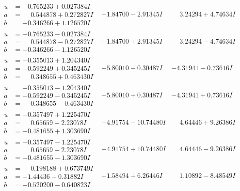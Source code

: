 \documentclass[1p]{elsarticle_modified}
\theoremstyle{definition}
\begin{document}
$$\begin{array}{c|c|c}
\begin{aligned}
u &= -0.765233 + 0.027384 I \\
a &= \phantom{-}0.544878 + 0.272827 I \\
b &= -0.346266 + 1.126520 I\end{aligned}
 & -1.84700 - 2.91345 I & \phantom{-}3.24294 + 4.74634 I \\ \hline\begin{aligned}
u &= -0.765233 - 0.027384 I \\
a &= \phantom{-}0.544878 - 0.272827 I \\
b &= -0.346266 - 1.126520 I\end{aligned}
 & -1.84700 + 2.91345 I & \phantom{-}3.24294 - 4.74634 I \\ \hline\begin{aligned}
u &= -0.355013 + 1.204340 I \\
a &= -0.592249 + 0.345245 I \\
b &= \phantom{-}0.348655 + 0.463430 I\end{aligned}
 & -5.80010 - 0.30487 I & -4.31941 - 0.73616 I \\ \hline\begin{aligned}
u &= -0.355013 - 1.204340 I \\
a &= -0.592249 - 0.345245 I \\
b &= \phantom{-}0.348655 - 0.463430 I\end{aligned}
 & -5.80010 + 0.30487 I & -4.31941 + 0.73616 I \\ \hline\begin{aligned}
u &= -0.357497 + 1.225470 I \\
a &= \phantom{-}0.65659 + 2.23078 I \\
b &= -0.481655 + 1.303690 I\end{aligned}
 & -4.91754 - 10.74480 I & \phantom{-}4.64446 + 9.26386 I \\ \hline\begin{aligned}
u &= -0.357497 - 1.225470 I \\
a &= \phantom{-}0.65659 - 2.23078 I \\
b &= -0.481655 - 1.303690 I\end{aligned}
 & -4.91754 + 10.74480 I & \phantom{-}4.64446 - 9.26386 I \\ \hline\begin{aligned}
u &= \phantom{-}0.198188 + 0.673749 I \\
a &= -1.44436 + 0.31882 I \\
b &= -0.520200 - 0.640823 I\end{aligned}
 & -1.58494 + 6.26446 I & \phantom{-}1.10892 - 8.48549 I \\ \hline\begin{aligned}

\end{aligned}
\end{array}$$
\end{document}
